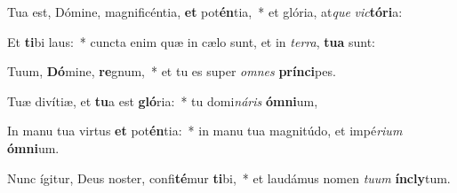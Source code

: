 \item Tua est, Dómine, magnificéntia, \textbf{et} pot\textbf{én}tia,~* et glória, at\textit{que} \textit{vic}\textbf{tó}\textbf{ri}a:
\item Et \textbf{ti}bi laus:~* cuncta enim quæ in cælo sunt, et in \textit{ter}\textit{ra}, \textbf{tu}\textbf{a} sunt:
\item Tuum, \textbf{Dó}mine, \textbf{re}gnum,~* et tu es super \textit{om}\textit{nes} \textbf{prín}\textbf{ci}pes.
\item Tuæ divítiæ, et \textbf{tu}a est \textbf{gló}ria:~* tu domi\textit{ná}\textit{ris} \textbf{óm}\textbf{ni}um,
\item In manu tua virtus \textbf{et} pot\textbf{én}tia:~* in manu tua magnitúdo, et impé\textit{ri}\textit{um} \textbf{óm}\textbf{ni}um.
\item Nunc ígitur, Deus noster, confi\textbf{té}mur \textbf{ti}bi,~* et laudámus nomen \textit{tu}\textit{um} \textbf{ín}\textbf{cly}tum.
